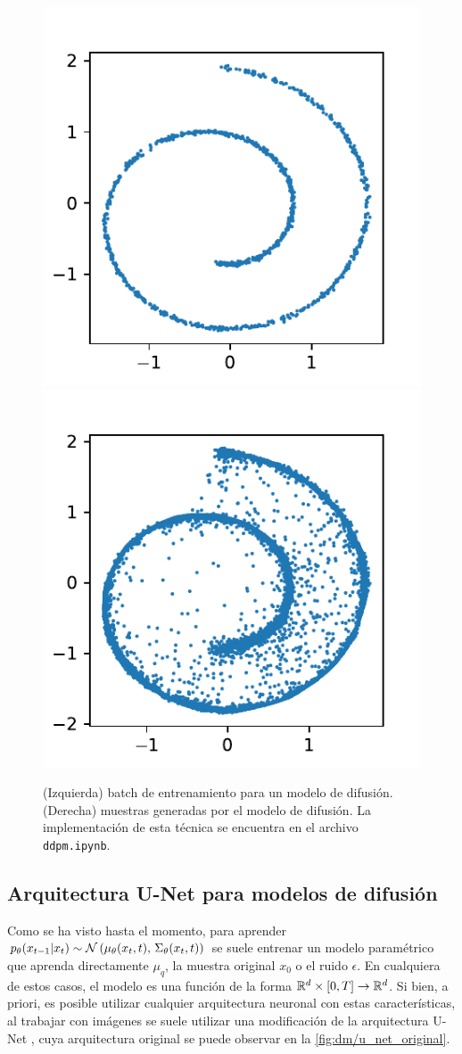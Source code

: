 
\begin{figure}[!ht]
    \centering
    \includegraphics[width=.35\textwidth]{images/dm/ddpm_data}
    \includegraphics[width=.35\textwidth]{images/dm/ddpm_samples}
    \caption{(Izquierda) batch de entrenamiento para un modelo de difusión. (Derecha) muestras generadas por el modelo de difusión. La implementación de esta técnica se encuentra en el archivo \texttt{ddpm.ipynb}.}
    \label{fig:dm/ddpm_samples}
\end{figure}

\subsection{Arquitectura U-Net para modelos de difusión}
\label{dm/discrete_dm/unet}

Como se ha visto hasta el momento, para aprender $p_\theta(x_{t-1}|x_t)\sim\mathcal{N}\left(\mu_\theta(x_t,t),\,\Sigma_\theta(x_t,t)\right)$ se suele entrenar un modelo paramétrico que aprenda directamente $\mu_q$, la muestra original $x_0$ o el ruido $\epsilon$. En cualquiera de estos casos, el modelo es una función de la forma $\mathbb{R}^d\times [0,T]\to\mathbb{R}^d$. Si bien, a priori, es posible utilizar cualquier arquitectura neuronal con estas características, al trabajar con imágenes se suele utilizar una modificación de la arquitectura U-Net \cite{ronneberger2015unet}, cuya arquitectura original se puede observar en la \autoref{fig:dm/u_net_original}.

